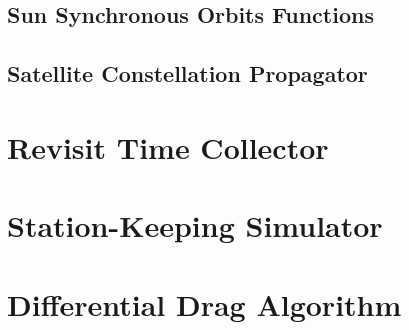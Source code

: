 \subsection{Sun Synchronous Orbits Functions}
\subsection{Satellite Constellation Propagator}

\section{Revisit Time Collector}

\section{Station-Keeping Simulator}

\section{Differential Drag Algorithm}
